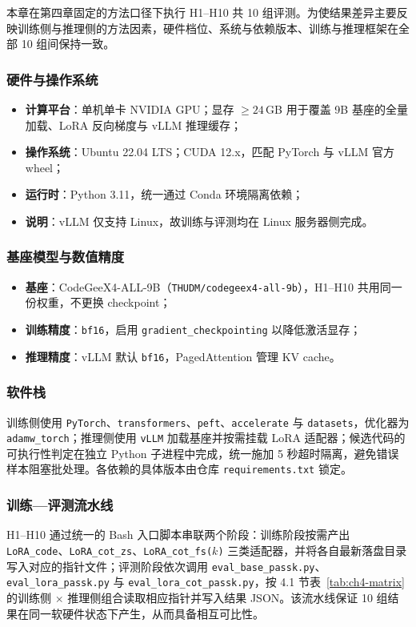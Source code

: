 
本章在第四章固定的方法口径下执行 H1--H10 共 10 组评测。为使结果差异主要反映训练侧与推理侧的方法因素，硬件档位、系统与依赖版本、训练与推理框架在全部 10 组间保持一致。

\subsubsection{硬件与操作系统}
\begin{itemize}
    \item \textbf{计算平台}：单机单卡 NVIDIA GPU；显存 $\geq 24$\,GB 用于覆盖 9B 基座的全量加载、LoRA 反向梯度与 vLLM 推理缓存；
    \item \textbf{操作系统}：Ubuntu 22.04 LTS；CUDA 12.x，匹配 PyTorch 与 vLLM 官方 wheel；
    \item \textbf{运行时}：Python 3.11，统一通过 Conda 环境隔离依赖；
    \item \textbf{说明}：vLLM 仅支持 Linux，故训练与评测均在 Linux 服务器侧完成。
\end{itemize}

\subsubsection{基座模型与数值精度}
\begin{itemize}
    \item \textbf{基座}：CodeGeeX4-ALL-9B（\texttt{THUDM/codegeex4-all-9b}），H1--H10 共用同一份权重，不更换 checkpoint；
    \item \textbf{训练精度}：\texttt{bf16}，启用 \texttt{gradient\_checkpointing} 以降低激活显存；
    \item \textbf{推理精度}：vLLM 默认 \texttt{bf16}，PagedAttention 管理 KV cache。
\end{itemize}

\subsubsection{软件栈}
训练侧使用 \texttt{PyTorch}、\texttt{transformers}、\texttt{peft}、\texttt{accelerate} 与 \texttt{datasets}，优化器为 \texttt{adamw\_torch}；推理侧使用 \texttt{vLLM} 加载基座并按需挂载 LoRA 适配器；候选代码的可执行性判定在独立 Python 子进程中完成，统一施加 5 秒超时隔离，避免错误样本阻塞批处理。各依赖的具体版本由仓库 \texttt{requirements.txt} 锁定。

\subsubsection{训练—评测流水线}
H1--H10 通过统一的 Bash 入口脚本串联两个阶段：训练阶段按需产出 \texttt{LoRA\_code}、\texttt{LoRA\_cot\_zs}、\texttt{LoRA\_cot\_fs($k$)} 三类适配器，并将各自最新落盘目录写入对应的指针文件；评测阶段依次调用 \texttt{eval\_base\_passk.py}、\texttt{eval\_lora\_passk.py} 与 \texttt{eval\_lora\_cot\_passk.py}，按 4.1 节表~\ref{tab:ch4-matrix} 的训练侧 $\times$ 推理侧组合读取相应指针并写入结果 JSON。该流水线保证 10 组结果在同一软硬件状态下产生，从而具备相互可比性。